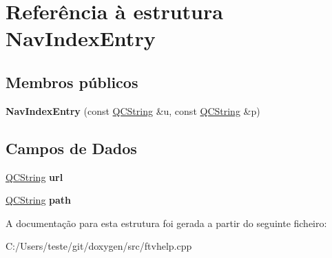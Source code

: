 \hypertarget{struct_nav_index_entry}{\section{Referência à estrutura Nav\-Index\-Entry}
\label{struct_nav_index_entry}
}
\subsection*{Membros públicos}
\begin{DoxyCompactItemize}
\item 
\hypertarget{struct_nav_index_entry_a84460f99f27bb108d08d17330ff61217}{{\bfseries Nav\-Index\-Entry} (const \hyperlink{class_q_c_string}{Q\-C\-String} \&u, const \hyperlink{class_q_c_string}{Q\-C\-String} \&p)}\label{struct_nav_index_entry_a84460f99f27bb108d08d17330ff61217}

\end{DoxyCompactItemize}
\subsection*{Campos de Dados}
\begin{DoxyCompactItemize}
\item 
\hypertarget{struct_nav_index_entry_ae460a12583d5413f9b10d653d645416e}{\hyperlink{class_q_c_string}{Q\-C\-String} {\bfseries url}}\label{struct_nav_index_entry_ae460a12583d5413f9b10d653d645416e}

\item 
\hypertarget{struct_nav_index_entry_a71216f035ef8cbf975e0712d46e89e9b}{\hyperlink{class_q_c_string}{Q\-C\-String} {\bfseries path}}\label{struct_nav_index_entry_a71216f035ef8cbf975e0712d46e89e9b}

\end{DoxyCompactItemize}


A documentação para esta estrutura foi gerada a partir do seguinte ficheiro\-:\begin{DoxyCompactItemize}
\item 
C\-:/\-Users/teste/git/doxygen/src/ftvhelp.\-cpp\end{DoxyCompactItemize}
